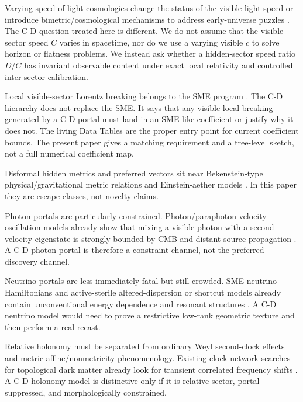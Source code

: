 \documentclass[11pt]{article}
\begin{document}
Varying-speed-of-light cosmologies change the status of the visible light speed or introduce bimetric/cosmological mechanisms to address early-universe puzzles \citep{AlbrechtMagueijo1999VSL,Magueijo2003VSLReview,Moffat2002VSLTheories,Magueijo2008BimetricVSL}. The C-D question treated here is different. We do not assume that the visible-sector speed \(C\) varies in spacetime, nor do we use a varying visible \(c\) to solve horizon or flatness problems. We instead ask whether a hidden-sector speed ratio \(D/C\) has invariant observable content under exact local relativity and controlled inter-sector calibration.


Local visible-sector Lorentz breaking belongs to the SME program \citep{ColladayKostelecky1998SME,KosteleckyRussell2011DataTablesSME}. The C-D hierarchy does not replace the SME. It says that any visible local breaking generated by a C-D portal must land in an SME-like coefficient or justify why it does not. The living Data Tables are the proper entry point for current coefficient bounds. The present paper gives a matching requirement and a tree-level sketch, not a full numerical coefficient map.


Disformal hidden metrics and preferred vectors sit near Bekenstein-type physical/gravitational metric relations and Einstein-aether models \citep{Bekenstein1993DisformalGeometry,Jacobson2008EinsteinAetherStatus}. In this paper they are escape classes, not novelty claims.


Photon portals are particularly constrained. Photon/paraphoton velocity oscillation models already show that mixing a visible photon with a second velocity eigenstate is strongly bounded by CMB and distant-source propagation \citep{Glashow1998PhotonVelocityOscillations,DeAngelisPain2002PhotonVelocityOscillations}. A C-D photon portal is therefore a constraint channel, not the preferred discovery channel.


Neutrino portals are less immediately fatal but still crowded. SME neutrino Hamiltonians and active-sterile altered-dispersion or shortcut models already contain unconventional energy dependence and resonant structures \citep{KosteleckyMewes2004Neutrinos,PaesPakvasaWeiler2005ShortcutSterile,HollenbergPaes2009ADRResonance,Barenboim2019SterileADRRevisited}. A C-D neutrino model would need to prove a restrictive low-rank geometric texture and then perform a real recast.


Relative holonomy must be separated from ordinary Weyl second-clock effects and metric-affine/nonmetricity phenomenology. Existing clock-network searches for topological dark matter already look for transient correlated frequency shifts \citep{LoboRomero2018SecondClockConstraints,HobsonLasenby2020WeylNoSecondClock,HobsonLasenby2021SecondClockNote,DereviankoPospelov2013TopologicalDMClocks,Wcislo2016OpticalClocksTopologicalDM,Roberts2017GPSDomainWallDM,Wcislo2018GlobalClockNetworkDM}. A C-D holonomy model is distinctive only if it is relative-sector, portal-suppressed, and morphologically constrained.
\end{document}
